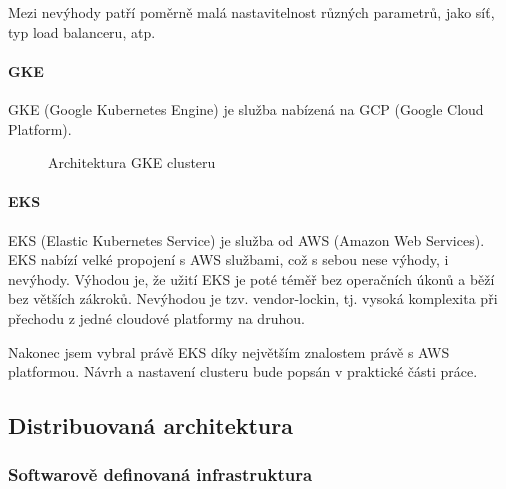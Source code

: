 \documentclass[thesis=M,czech]{FITthesis}[2019/12/23]
\theoremstyle{plain}
\theoremstyle{definition}
\begin{document}
Mezi nevýhody patří poměrně malá nastavitelnost různých parametrů, jako síť, typ load balanceru, atp. 


\paragraph{GKE}

GKE (Google Kubernetes Engine)\cite{gke} je služba nabízená na GCP (Google Cloud Platform). 



\begin{figure}[H]\centering
	

	\caption[Architektura GKE clusteru]{Architektura GKE clusteru}\label{fig:float}
\end{figure}
		
		

\paragraph{EKS}

EKS (Elastic Kubernetes Service)\cite{eks} je služba od AWS (Amazon Web Services). EKS nabízí velké propojení s AWS službami, což s sebou nese výhody, i nevýhody. Výhodou je, že užití EKS je poté téměř bez operačních úkonů a běží bez větších zákroků. Nevýhodou je tzv. vendor-lockin, tj. vysoká komplexita při přechodu z jedné cloudové platformy na druhou.



Nakonec jsem vybral právě EKS díky největším znalostem právě s AWS platformou. Návrh a nastavení clusteru bude popsán v praktické části práce. 








\subsection{Distribuovaná architektura}


\subsubsection{Softwarově definovaná infrastruktura}
\end{document}
